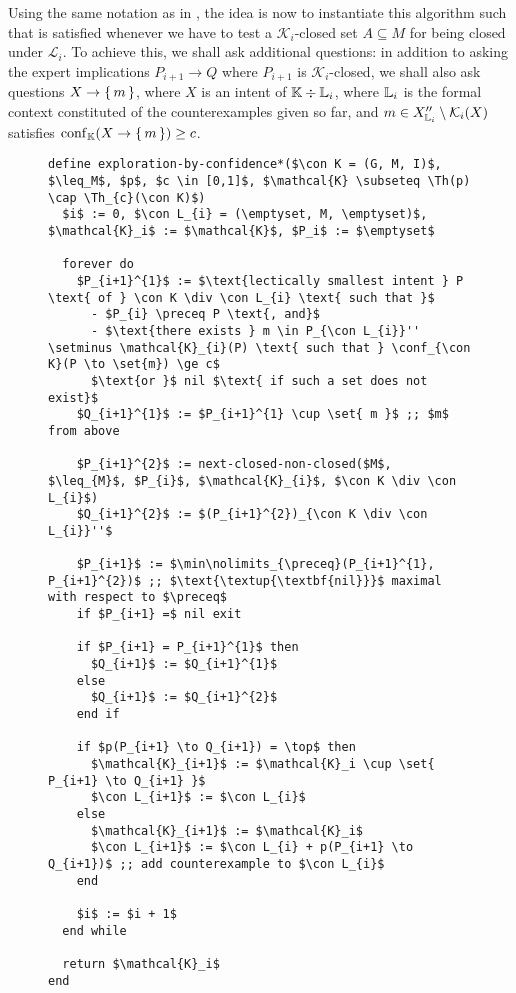 Using the same notation as in , the idea is
now to instantiate this algorithm such that  is satisfied whenever we have to
test a $\mathcal{K}_{i}$-closed set $A \subseteq M$ for being closed under
$\mathcal{L}_{i}$.  To achieve this, we shall ask additional questions: in addition to
asking the expert implications $P_{i+1} \to Q$ where $P_{i+1}$ is
$\mathcal{K}_{i}$-closed, we shall also ask questions $X \to {\ensuremath{\{\,m\,\}}}$, where $X$ is an
intent of ${\mathbb{K}} \div {\ensuremath{\mathbb{L}}}_{i}$, where ${\mathbb{L}}_{i}$ is the formal context constituted
of the counterexamples given so far, and $m \in X_{{\mathbb{L}}_{i}}'' \setminus
\mathcal{K}_{i}(X)$ satisfies $\operatorname{conf}_{{\mathbb{K}}}(X \to {\ensuremath{\{\,m\,\}}}) \ge c$.


\begin{figure}[tp]
  \begin{Algorithm}
    \label{alg:exploration-by-confidence-without-Th_c(K)-closures}
    \hspace*{0cm}
\begin{lstlisting}
define exploration-by-confidence*($\con K = (G, M, I)$, $\leq_M$, $p$, $c \in [0,1]$, $\mathcal{K} \subseteq \Th(p) \cap \Th_{c}(\con K)$)
  $i$ := 0, $\con L_{i} = (\emptyset, M, \emptyset)$, $\mathcal{K}_i$ := $\mathcal{K}$, $P_i$ := $\emptyset$

  forever do
    $P_{i+1}^{1}$ := $\text{lectically smallest intent } P \text{ of } \con K \div \con L_{i} \text{ such that }$
      - $P_{i} \preceq P \text{, and}$
      - $\text{there exists } m \in P_{\con L_{i}}'' \setminus \mathcal{K}_{i}(P) \text{ such that } \conf_{\con K}(P \to \set{m}) \ge c$
      $\text{or }$ nil $\text{ if such a set does not exist}$
    $Q_{i+1}^{1}$ := $P_{i+1}^{1} \cup \set{ m }$ ;; $m$ from above

    $P_{i+1}^{2}$ := next-closed-non-closed($M$, $\leq_{M}$, $P_{i}$, $\mathcal{K}_{i}$, $\con K \div \con L_{i}$)
    $Q_{i+1}^{2}$ := $(P_{i+1}^{2})_{\con K \div \con L_{i}}''$

    $P_{i+1}$ := $\min\nolimits_{\preceq}(P_{i+1}^{1}, P_{i+1}^{2})$ ;; $\text{\textup{\textbf{nil}}}$ maximal with respect to $\preceq$
    if $P_{i+1} =$ nil exit

    if $P_{i+1} = P_{i+1}^{1}$ then
      $Q_{i+1}$ := $Q_{i+1}^{1}$
    else
      $Q_{i+1}$ := $Q_{i+1}^{2}$
    end if

    if $p(P_{i+1} \to Q_{i+1}) = \top$ then
      $\mathcal{K}_{i+1}$ := $\mathcal{K}_i \cup \set{ P_{i+1} \to Q_{i+1} }$
      $\con L_{i+1}$ := $\con L_{i}$
    else
      $\mathcal{K}_{i+1}$ := $\mathcal{K}_i$
      $\con L_{i+1}$ := $\con L_{i} + p(P_{i+1} \to Q_{i+1})$ ;; add counterexample to $\con L_{i}$
    end

    $i$ := $i + 1$
  end while

  return $\mathcal{K}_i$  
end
\end{lstlisting}
  \end{Algorithm}
\end{figure}

